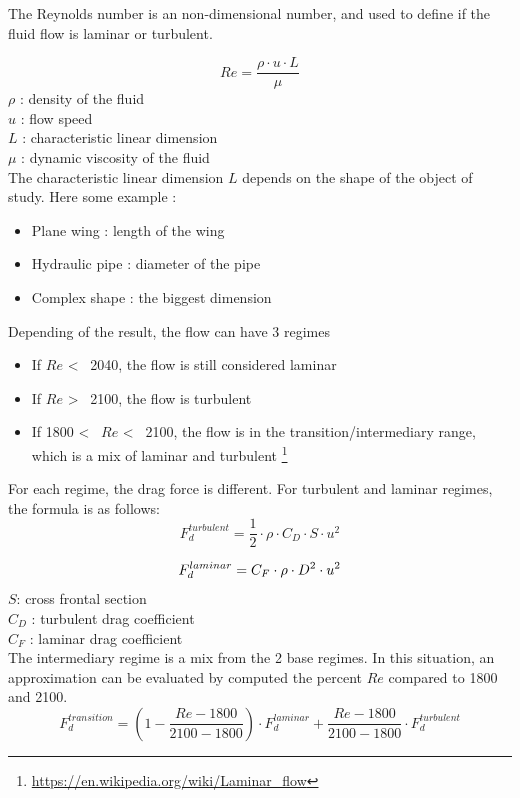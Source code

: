 \documentclass[12pt,a4paper]{article}
\begin{document}
The Reynolds number is an non-dimensional number, and used to define if the fluid flow is laminar or turbulent.

\begin{equation}
    Re = \frac{\rho \cdot u \cdot L}{\mu}
\end{equation}
$\rho$ : density of the fluid\\
$u$ : flow speed\\
$L$ : characteristic linear dimension\\
$\mu$ : dynamic viscosity of the fluid\\

The characteristic linear dimension $L$ depends on the shape of the object of study. Here some example :
\begin{itemize}
    \item Plane wing : length of the wing
    \item Hydraulic pipe : diameter of the pipe
    \item Complex shape : the biggest dimension
\end{itemize}
Depending of the result, the flow can have 3 regimes

\begin{itemize}
    \item If $Re$ <~ 2040, the flow is still considered laminar
    \item If $Re$ >~ 2100, the flow is turbulent
    \item If 1800 <~ $Re$ <~ 2100, the flow is in the transition/intermediary range, which is a mix of laminar and turbulent \footnote{\url{https://en.wikipedia.org/wiki/Laminar_flow}}
\end{itemize}

For each regime, the drag force is different.
For turbulent and laminar regimes, the formula is as follows:
\begin{equation}
    F_d^{turbulent} = \frac{1}{2} \cdot \rho \cdot C_D \cdot S \cdot u^2
\end{equation}

\begin{equation}
    F_d^{laminar} = C_F \cdot \rho \cdot  D^2 \cdot u^2\\
\end{equation}
$S$: cross frontal section\\
$C_D$ : turbulent drag coefficient\\
$C_F$ : laminar drag coefficient\\

The intermediary regime is a mix from the 2 base regimes. In this situation, an approximation can be evaluated by computed the percent $Re$ compared to 1800 and 2100.
\begin{equation}
    F_d^{transition} = (1- \frac{Re - 1800}{2100-1800}) \cdot F_d^{laminar} + \frac{Re - 1800}{2100-1800} \cdot F_d^{turbulent}
\end{equation}
\end{document}

